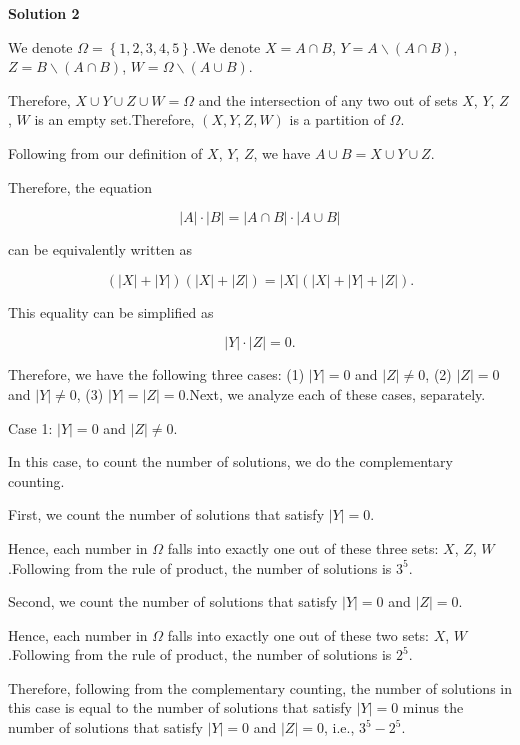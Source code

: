 \begin{enumerate}
 



\textbf{Solution 2}

We denote $\Omega = \left\{ 1 , 2 , 3 , 4 , 5 \right\}$.We denote $X = A \cap B$, $Y = A \backslash \left( A \cap B \right)$, $Z = B \backslash \left( A \cap B \right)$, $W = \Omega \backslash \left( A \cup B \right)$.

 Therefore, $X \cup Y \cup Z \cup W = \Omega$ and the intersection of any two out of sets $X$, $Y$, $Z$, $W$ is an empty set.Therefore, $\left( X , Y , Z , W \right)$ is a partition of $\Omega$.

 Following from our definition of $X$, $Y$, $Z$, we have $A \cup B = X \cup Y \cup Z$.

 Therefore, the equation 

 
 \[|A| \cdot |B| = |A \cap B| \cdot |A \cup B|\]

 can be equivalently written as

 
 \[\left( | X | + | Y | \right) \left( | X | + | Z | \right) = | X | \left( | X | + | Y | + | Z | \right) .\]

 This equality can be simplified as

 
 \[| Y | \cdot | Z | = 0 .\]

 Therefore, we have the following three cases: (1) $|Y| = 0$ and $|Z| \neq 0$, (2) $|Z| = 0$ and $|Y| \neq 0$, (3) $|Y| = |Z| = 0$.Next, we analyze each of these cases, separately.

 Case 1: $|Y| = 0$ and $|Z| \neq 0$.

 In this case, to count the number of solutions, we do the complementary counting. 

 First, we count the number of solutions that satisfy $|Y| = 0$.

 Hence, each number in $\Omega$ falls into exactly one out of these three sets: $X$, $Z$, $W$.Following from the rule of product, the number of solutions is $3^5$.

 Second, we count the number of solutions that satisfy $|Y| = 0$ and $|Z| = 0$.

 Hence, each number in $\Omega$ falls into exactly one out of these two sets: $X$, $W$.Following from the rule of product, the number of solutions is $2^5$.

 Therefore, following from the complementary counting, the number of solutions in this case is equal to the number of solutions that satisfy $|Y| = 0$ minus the number of solutions that satisfy $|Y| = 0$ and $|Z| = 0$, i.e., $3^5 - 2^5$.


\end{enumerate}
